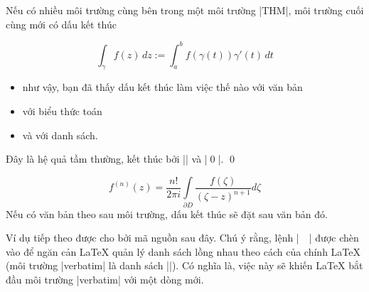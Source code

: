 Nếu có nhiều môi trường cùng bên trong một môi trường |THM|,
môi trường cuối cùng mới có dấu kết thúc
\begin{Definition}
\begin{equation}
 \int_{\gamma} f(z)\, dz := \int_a^b f(\gamma (t)) \gamma'(t) \, dt
\end{equation}
\begin{itemize}
\item như vậy, bạn đã thấy dấu kết thúc làm việc thế nào với văn bản
\item với biểu thức toán
\item và với danh sách.
\end{itemize}
\end{Definition}

\begin{Corollary}[Q.E.D.]
Đây là hệ quả tầm thường, kết thúc bởi
||  và |\qed|.
\qed
\end{Corollary}

\begin{Example}
\[ f^{(n)}(z) =
   \frac{n!}{2\pi i} \int \limits _{\partial D}
            \frac{f(\zeta)}{(\zeta-z)^{n+1}} d\zeta \]
Nếu có văn bản theo sau môi trường, dấu kết thúc sẽ đặt sau văn bản đó.
\end{Example}

\medskip
Ví dụ tiếp theo được cho bởi mã nguồn sau đây. Chú ý rằng,
lệnh |~\hfill~| được chèn vào để ngăn cản \LaTeX{} quản lý danh sách lồng nhau
theo cách của chính \LaTeX{} (môi trường |verbatim| là danh sách |\trivlist|).
Có nghĩa là, việc này sẽ khiến \LaTeX{} bắt đầu môi trường |verbatim|
với một dòng mới.
\begin{command}
\end{command}

